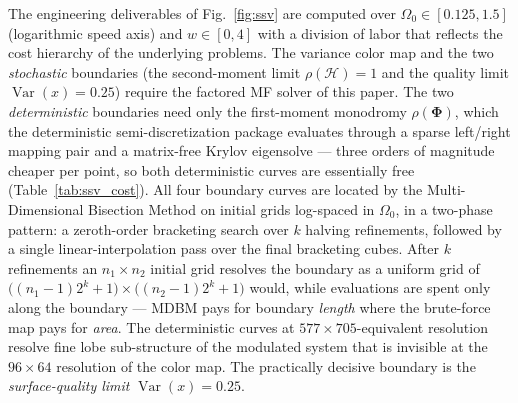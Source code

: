 \documentclass[preprint,12pt]{elsarticle}
\begin{document}
The engineering deliverables of Fig.~\ref{fig:ssv} are computed over $\Omega_0 \in [0.125, 1.5]$ (logarithmic speed axis) and $w \in [0, 4]$ with a division of labor that reflects the cost hierarchy of the underlying problems. The variance color map and the two \emph{stochastic} boundaries (the second-moment limit $\rho(\mathcal{H})=1$ and the quality limit $\operatorname{Var}(x)=0.25$) require the factored MF solver of this paper. The two \emph{deterministic} boundaries need only the first-moment monodromy $\rho(\boldsymbol\Phi)$, which the deterministic semi-discretization package \cite{BachrathySDMjl} evaluates through a sparse left/right mapping pair and a matrix-free Krylov eigensolve --- three orders of magnitude cheaper per point, so both deterministic curves are essentially free (Table~\ref{tab:ssv_cost}). All four boundary curves are located by the Multi-Dimensional Bisection Method \cite{Bachrathy2021} on initial grids log-spaced in $\Omega_0$, in a two-phase pattern: a zeroth-order bracketing search over $k$ halving refinements, followed by a single linear-interpolation pass over the final bracketing cubes. After $k$ refinements an $n_1\times n_2$ initial grid resolves the boundary as a uniform grid of $\big((n_1{-}1)2^k{+}1\big)\times\big((n_2{-}1)2^k{+}1\big)$ would, while evaluations are spent only along the boundary --- MDBM pays for boundary \emph{length} where the brute-force map pays for \emph{area}. The deterministic curves at $577\times705$-equivalent resolution resolve fine lobe sub-structure of the modulated system that is invisible at the $96\times64$ resolution of the color map. The practically decisive boundary is the \emph{surface-quality limit} $\operatorname{Var}(x) = 0.25$.
\end{document}
